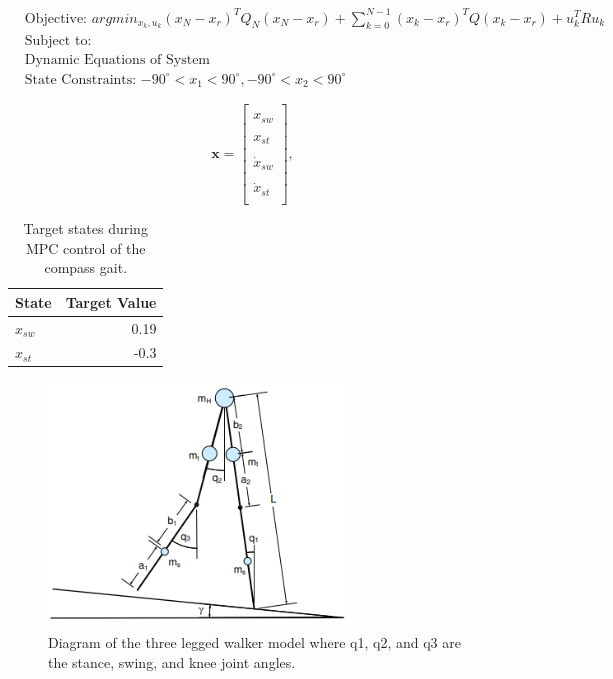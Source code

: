 \documentclass{./springer/svjour3}
\newcommand{\mb}[1]{\mathbf{#1}}
\begin{document}
\begin{equation}
  \begin{aligned}
  &\text{Objective: $arg min_{x_k,u_k} (x_N - x_r)^TQ_N(x_N - x_r) + \sum_{k = 0}^{N-1} (x_k - x_r)^TQ(x_k - x_r) + u_k^TRu_k $}\\
  &\text{Subject to:}\\
  &\text{Dynamic Equations of System}\\
  &\text{State Constraints: $-90^{\circ} < x_1 < 90^{\circ }, -90^{\circ} < x_2 < 90^{\circ }  $}
  \end{aligned}
  \label{eq:twolegopt}
\end{equation}

\begin{equation}
  \mb{x} = 
  \begin{bmatrix}
  \\x_{sw}\\
  \\x_{st}\\
  \\\dot{x}_{sw}\\
  \\\dot{x}_{st}\\
  \end{bmatrix}, \quad
  \label{eq:twolegstates}
\end{equation}

\begin{table}[h]
  \centering
  \caption{Target states during MPC control of the compass gait.}
  \begin{tabular}{lr}
  \toprule
  State & Target Value \\
  \midrule
  $x_{sw}$ & 0.19 \\
  $x_{st}$ & -0.3 \\
  \end{tabular}
  \label{tab:twolegterm}
\end{table}


\begin{figure}[!h]
  \centering
  \includegraphics[width=8cm]{./figures/threeleg.png}
  \caption{Diagram of the three legged walker model where q1, q2, and q3 are the stance, swing, and knee joint angles.}
  \label{fig:threeleg}
\end{figure}
\end{document}
